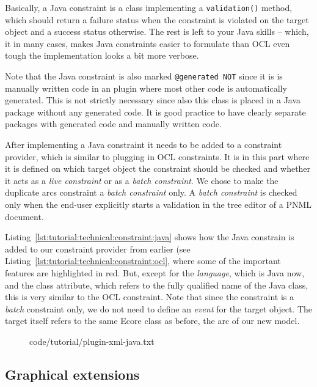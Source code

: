 Basically, a Java constraint is a class implementing a {\tt validation()}
method, which should return a failure status when the constraint is violated
on the target object and a success status otherwise. The rest is left to your
Java skills -- which, it in many cases, makes Java constraints easier to
formulate than OCL even tough the implementation looks a bit more verbose.

Note that the Java constraint is also marked {\tt @generated NOT} since it is
is manually written code in an plugin where most other code is automatically
generated. This is not strictly necessary since also this class is placed
in a Java package without any generated code. It is good practice to have 
clearly separate packages with generated code and manually written code.

After implementing a Java constraint it needs to be added to a constraint
provider, which is similar to plugging in OCL constraints. It is in this
part where it is defined on which target object the constraint should be
checked and whether it acts as a \emph{live constraint} or as  a \emph{batch
constraint}.
We chose to make the duplicate arcs constraint a \emph{batch constraint} only.
A \emph{batch constraint} is checked only when
the end-user explicitly starts a validation in the tree editor of a PNML
document.

Listing~\ref{lst:tutorial:technical:constraint:java} shows how the Java
constrain is added to our constraint provider from earlier (see
Listing~\ref{lst:tutorial:technical:constraint:ocl}, where some of the important
features are highlighted in red. But, except for the \emph{language}, which is
Java now, and the class attribute, which refers to the fully qualified name of
the Java class, this is very similar to the OCL constraint.
Note that since the constraint is a \emph{batch} constraint only, we do not need
to define an \emph{event} for the target object. The target itself refers to
the same Ecore class as before, the arc of our new model.

\begin{figure}[htbp!]
%
  {code/tutorial/plugin-xml-java.txt}
\end{figure}

\subsection{Graphical extensions}
\label{sec:tutorial:technical:graphics}


